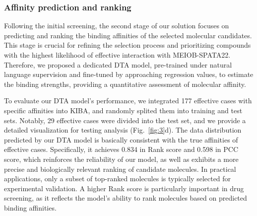 \documentclass[preprint,12pt]{elsarticle}
\theoremstyle{plain}
\theoremstyle{definition}
\theoremstyle{remark}
\begin{document}
\subsubsection*{Affinity prediction and ranking} %

Following the initial screening, the second stage of our solution focuses on predicting and ranking the binding affinities of the selected molecular candidates. This stage is crucial for refining the selection process and prioritizing compounds with the highest likelihood of effective interaction with MEIOB-SPATA22. Therefore, we proposed a dedicated DTA model, pre-trained under natural language supervision and fine-tuned by approaching regression values, to estimate the binding strengths, providing a quantitative assessment of molecular affinity.

To evaluate our DTA model's performance, we integrated 177 effective cases with specific affinities into KIBA, and randomly splited them into training and test sets. Notably, 29 effective cases were divided into the test set, and we provide a detailed visualization for testing analysis (Fig.~\ref{fig:3}d). The data distribution predicted by our DTA model is basically consistent with the true affinities of effective cases. Specifically, it achieves 0.834 in Rank score and 0.598 in PCC score, which reinforces the reliability of our model, as well as exhibits a more precise and biologically relevant ranking of candidate molecules. In practical applications, only a subset of top-ranked molecules is typically selected for experimental validation. A higher Rank score is particularly important in drug screening, as it reflects the model's ability to rank molecules based on predicted binding affinities.
\end{document}
